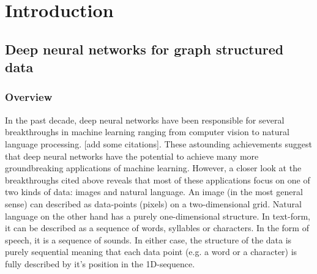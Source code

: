 \chapter{Introduction}
\label{chapter:Introduction}



\section{Deep neural networks for graph structured data}

\subsection{Overview}

In the past decade, deep neural networks have been responsible for several breakthroughs in machine learning ranging from computer vision to natural language processing. [add some citations]. These astounding achievements suggest that deep neural networks have the potential to achieve many more groundbreaking applications of machine learning. However, a closer look at the breakthroughs cited above reveals that most of these applications focus on one of two kinds of data: images and natural language. An image (in the most general sense) can described as data-points (pixels) on a two-dimensional grid. Natural language on the other hand has a purely one-dimensional structure. In text-form, it can be described as a sequence of words, syllables or characters. In the form of speech, it is a sequence of sounds. In either case, the structure of the data is purely sequential meaning that each data point (e.g. a word or a character) is fully described by it's position in the 1D-sequence.

